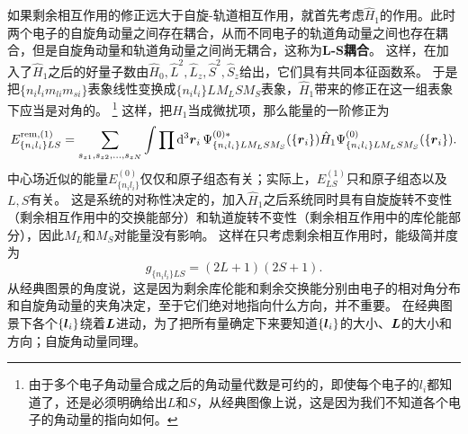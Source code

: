 \documentclass[UTF8, a4paper]{ctexart}
\begin{document}
如果剩余相互作用的修正远大于自旋-轨道相互作用，就首先考虑$\hat{H}_1$的作用。此时两个电子的自旋角动量之间存在耦合，从而不同电子的轨道角动量之间也存在耦合，但是自旋角动量和轨道角动量之间尚无耦合，这称为\textbf{L-S耦合}。
这样，在加入了$\hat{H}_1$之后的好量子数由$\hat{H}_0, \hat{L}^2, \hat{L}_z, \hat{S}^2, \hat{S}_z$给出，它们具有共同本征函数系。
于是把$\{n_i l_i m_{li} m_{si}\}$表象线性变换成$\{n_i l_i\} L M_L S M_S$表象，$\hat{H}_1$带来的修正在这一组表象下应当是对角的。%
\footnote{由于多个电子角动量合成之后的角动量代数是可约的，即使每个电子的$l_i$都知道了，还是必须明确给出$L$和$S$，从经典图像上说，这是因为我们不知道各个电子的角动量的指向如何。}%
这样，把$\hat{H}_1$当成微扰项，那么能量的一阶修正为
\begin{equation}
    E^{\text{rem}, (1)}_{\{n_i l_i\} LS} = \sum_{s_{z1}, s_{z2}, \ldots, s_{zN}} \int \prod \dd[3]{\vb*{r}_i} \Psi^{(0) *}_{\{n_i l_i\} L M_L S M_S}(\{\vb*{r}_i\}) \hat{H}_1 \Psi^{(0)}_{\{n_i l_i\} L M_L S M_S}(\{\vb*{r}_i\}).
    \label{eq:ls-1}
\end{equation}
中心场近似的能量$E^{(0)}_{\{n_i l_i\}}$仅仅和原子组态有关；实际上，$E^{(1)}_{LS}$只和原子组态以及$L,S$有关。
这是系统的对称性决定的，加入$\hat{H}_1$之后系统同时具有自旋旋转不变性（剩余相互作用中的交换能部分）和轨道旋转不变性（剩余相互作用中的库伦能部分），因此$M_L$和$M_S$对能量没有影响。
这样在只考虑剩余相互作用时，能级简并度为
\begin{equation}
    g_{\{n_i l_i\}LS} = (2L+1)(2S+1).
\end{equation}
从经典图景的角度说，这是因为剩余库伦能和剩余交换能分别由电子的相对角分布和自旋角动量的夹角决定，至于它们绝对地指向什么方向，并不重要。
在经典图景下各个$\{\vb*{l}_i\}$绕着$\vb*{L}$进动，为了把所有量确定下来要知道$\{\vb*{l}_i\}$的大小、$\vb*{L}$的大小和方向；自旋角动量同理。
\end{document}

